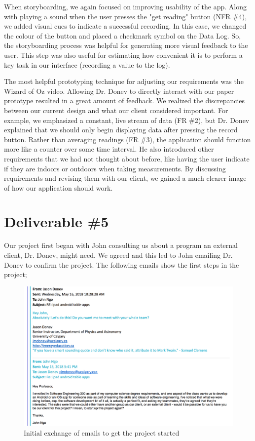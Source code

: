 \documentclass[11pt,a4paper]{article}
\begin{document}
When storyboarding, we again focused on improving usability of the app. Along with playing a sound when the user presses the "get reading" button (NFR \#4), we added visual cues to indicate a successful recording. In this case, we changed the colour of the button and placed a checkmark symbol on the Data Log. So, the storyboarding process was helpful for generating more visual feedback to the user. This step was also useful for estimating how convenient it is to perform a key task in our interface (recording a value to the log).

The most helpful prototyping technique for adjusting our requirements was the Wizard of Oz video. Allowing Dr. Donev to directly interact with our paper prototype resulted in a great amount of feedback. We realized the discrepancies between our current design and what our client considered important. For example, we emphasized a constant, live stream of data (FR \#2), but Dr. Donev explained that we should only begin displaying data after pressing the record button. Rather than averaging readings (FR \#3), the application should function more like a counter over some time interval. He also introduced other requirements that we had not thought about before, like having the user indicate if they are indoors or outdoors when taking measurements. By discussing requirements and revising them with our client, we gained a much clearer image of how our application should work.



\newpage
\section*{Deliverable \#5}

Our project first began with John consulting us about a program an external client, Dr. Donev, might need. We agreed and this led to John emailing Dr. Donev to confirm the project. The following emails show the first steps in the project; 
\bigskip
\begin{figure}[h]
  \centering
      \includegraphics[width=1.1\textwidth]{1.png}
  \caption{Initial exchange of emails to get the project started}
\end{figure}
\end{document}
